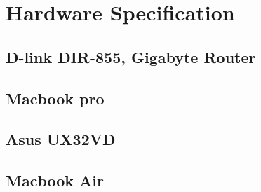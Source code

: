 
\chapter{Hardware Specification}\label{appendix:HardwareSpecification}


\section{D-link DIR-855, Gigabyte Router}



\section{Macbook pro}\label{appendix:hardwareSpecification_pro}

\section{Asus UX32VD}\label{appendix:hardwareSpecification_asus}

\section{Macbook Air}\label{appendix:hardwareSpecification_air}
